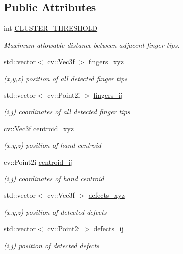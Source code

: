 \subsection*{Public Attributes}
\begin{DoxyCompactItemize}
\item 
int \hyperlink{class_hand_a8fee584c52a9c38a8c9500b86859a610}{C\+L\+U\+S\+T\+E\+R\+\_\+\+T\+H\+R\+E\+S\+H\+O\+LD}
\begin{DoxyCompactList}\small\item\em Maximum allowable distance between adjacent finger tips. \end{DoxyCompactList}\item 
std\+::vector$<$ cv\+::\+Vec3f $>$ \hyperlink{class_hand_afb4b29e1aaca7d0779af899a9eeaa21d}{fingers\+\_\+xyz}
\begin{DoxyCompactList}\small\item\em (x,y,z) position of all detected finger tips \end{DoxyCompactList}\item 
std\+::vector$<$ cv\+::\+Point2i $>$ \hyperlink{class_hand_a4539e1c12c9c3ef9218d4e96c3aebd4b}{fingers\+\_\+ij}
\begin{DoxyCompactList}\small\item\em (i,j) coordinates of all detected finger tips \end{DoxyCompactList}\item 
cv\+::\+Vec3f \hyperlink{class_hand_af1d336666d556ea9d900bdd7bae6b88c}{centroid\+\_\+xyz}
\begin{DoxyCompactList}\small\item\em (x,y,z) position of hand centroid \end{DoxyCompactList}\item 
cv\+::\+Point2i \hyperlink{class_hand_a1b7c44a205ea0ec4a89a24abc8ce84af}{centroid\+\_\+ij}
\begin{DoxyCompactList}\small\item\em (i,j) coordinates of hand centroid \end{DoxyCompactList}\item 
std\+::vector$<$ cv\+::\+Vec3f $>$ \hyperlink{class_hand_aad21d7ee1c845701e47c37d6c5ac96d5}{defects\+\_\+xyz}
\begin{DoxyCompactList}\small\item\em (x,y,z) position of detected defects \end{DoxyCompactList}\item 
std\+::vector$<$ cv\+::\+Point2i $>$ \hyperlink{class_hand_a7d0281af3003f2f935115e5956056415}{defects\+\_\+ij}
\begin{DoxyCompactList}\small\item\em (i,j) position of detected defects \end{DoxyCompactList}\end{DoxyCompactItemize}
